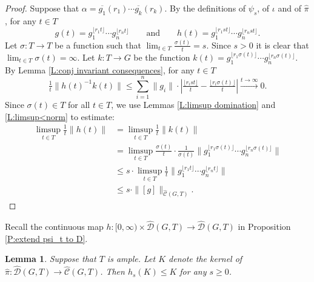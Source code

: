 \documentclass[12pt]{amsart}
\newtheorem{lemma}[prop]{Lemma}
\theoremstyle{definition}
\def\RR{\ensuremath{\mathbb{R}}}
\newcommand{\B}[1]{\mathbf{#1}}
\newcommand{\xto}[1]{\xrightarrow{#1}}
\def\Free{F}
\def\D{\mathcal{D}}
\def\tC{\hat{\mathcal{C}}}
\def\tD{\hat{\D}}
\newcommand{\Myfloor}[1]{\lfloor #1 \rfloor}
\begin{document}
\begin{proof}
Suppose that $\alpha = \overline{g_1}(r_1) \cdots \overline{g_k}(r_k)$.
By the definitions of $\psi_s$, of $\iota$ and of $\hat{\pi}$, for any $t \in T$
\[
g(t) = g_1^{\Myfloor{r_1t}} \cdots g_n^{\Myfloor{r_nt}} \qquad \text{and} \qquad h(t) = g_1^{\Myfloor{r_1st}} \cdots g_n^{\Myfloor{r_nst}}.
\]
Let $\sigma \colon T \to T$ be a function such that $\lim_{t \in T} \tfrac{\sigma(t)}{t}=s$.
Since $s>0$ it is clear that $\lim_{t \in T} \sigma(t)=\infty$.
Let $k \colon T \to G$ be the function $k(t)=g_1^{\Myfloor{r_1\sigma(t)}} \cdots g_n^{\Myfloor{r_n\sigma(t)}}$.
By Lemma \ref{L:conj invariant consequences}, for any $t \in T$
\[
\tfrac{1}{t}\| h(t)^{-1} k(t)\| \leq
\sum_{i=1}^n \|g_i\| \cdot \left| \tfrac{\Myfloor{r_ist}}{t} - \tfrac{\Myfloor{r_i\sigma(t)}}{t} \right| \xto{t \to \infty} 0.
\]
Since $\sigma(t) \in T$ for all $t \in T$, we use Lemmas \ref{L:limsup domination} and \ref{L:limsup<norm} to estimate:
\begin{align*}
\limsup_{t \in T} \tfrac{1}{t} \|h(t)\| &=
\limsup_{t \in T} \tfrac{1}{t} \|k(t)\| 
\\
&=
\limsup_{t \in T} \tfrac{\sigma(t)}{t} \cdot \tfrac{1}{\sigma(t)} \|g_1^{\Myfloor{r_1\sigma(t)}} \cdots g_n^{\Myfloor{r_n\sigma(t)}}\|
\\
& \leq
s \cdot \limsup_{t \in T} \tfrac{1}{t} \|g_1^{\Myfloor{r_1t}} \cdots g_n^{\Myfloor{r_nt}}\|
\\
& \leq
s \cdot \| [g] \|_{\tC(G,T)}.
\end{align*}
\end{proof}







Recall the continuous map $h \colon [0,\infty) \times \tD(G,T) \to \tD(G,T)$ in Proposition \ref{P:extend psi_t to D}.





\begin{lemma}\label{L:h-t preserves kerel}
Suppose that $T$ is ample.
Let $K$ denote the kernel of $\hat{\pi} \colon \tD(G,T) \to \tC(G,T)$.
Then $h_s(K) \leq K$ for any $s \geq 0$.
\end{lemma}
\end{document}
